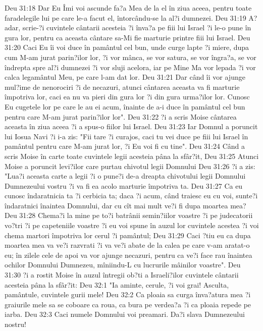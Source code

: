 Deu 31:18  Dar Eu Îmi voi ascunde fa?a Mea de la el în ziua aceea, pentru toate faradelegile lui pe care le-a facut el, întorcându-se la al?i dumnezei.
Deu 31:19  A?adar, scrie-?i cuvintele cântarii acesteia ?i înva?a pe fiii lui Israel ?i le-o pune în gura lor, pentru ca aceasta cântare sa-Mi fie marturie printre fiii lui Israel.
Deu 31:20  Caci Eu îi voi duce în pamântul cel bun, unde curge lapte ?i miere, dupa cum M-am jurat parin?ilor lor, ?i vor mânca, se vor satura, se vor îngra?a, se vor îndrepta spre al?i dumnezei ?i vor sluji acelora, iar pe Mine Ma vor lepada ?i vor calca legamântul Meu, pe care l-am dat lor.
Deu 31:21  Dar când îi vor ajunge mul?ime de nenorociri ?i de necazuri, atunci cântarea aceasta va fi marturie împotriva lor, caci ea nu va pieri din gura lor ?i din gura urma?ilor lor. Cunosc Eu cugetele lor pe care le au ei acum, înainte de a-i duce în pamântul cel bun pentru care M-am jurat parin?ilor lor".
Deu 31:22  ?i a scris Moise cântarea aceasta în ziua aceea ?i a spus-o fiilor lui Israel.
Deu 31:23  Iar Domnul a poruncit lui Iosua Navi ?i i-a zis: "Fii tare ?i curajos, caci tu vei duce pe fiii lui Israel în pamântul pentru care M-am jurat lor, ?i Eu voi fi cu tine".
Deu 31:24  Când a scris Moise în carte toate cuvintele legii acesteia pâna la sfâr?it,
Deu 31:25  Atunci Moise a poruncit levi?ilor care purtau chivotul legii Domnului
Deu 31:26  ?i a zis: "Lua?i aceasta carte a legii ?i o pune?i de-a dreapta chivotului legii Domnului Dumnezeului vostru ?i va fi ea acolo marturie împotriva ta.
Deu 31:27  Ca eu cunosc îndaratnicia ta ?i cerbicia ta; daca ?i acum, când traiesc eu cu voi, sunte?i îndaratnici înaintea Domnului, dar cu cît mai mult ve?i fi dupa moartea mea?
Deu 31:28  Chema?i la mine pe to?i batrânii semin?iilor voastre ?i pe judecatorii vo?tri ?i pe capeteniile voastre ?i eu voi spune în auzul lor cuvintele acestea ?i voi chema martori împotriva lor cerul ?i pamântul;
Deu 31:29  Caci ?tiu eu ca dupa moartea mea va ve?i razvrati ?i va ve?i abate de la calea pe care v-am aratat-o eu; în zilele cele de apoi va vor ajunge necazuri, pentru ca ve?i face rau înaintea ochilor Domnului Dumnezeu, mîniindu-L cu lucrurile mâinilor voastre".
Deu 31:30  ?i a rostit Moise în auzul întregii ob?ti a Israeli?ilor cuvintele cântarii acesteia pâna la sfâr?it:
Deu 32:1  "Ia aminte, cerule, ?i voi grai! Asculta, pamântule, cuvintele gurii mele!
Deu 32:2  Ca ploaia sa curga înva?atura mea ?i graiurile mele sa se coboare ca roua, ca bura pe verdea?a ?i ca ploaia repede pe iarba.
Deu 32:3  Caci numele Domnului voi preamari. Da?i slava Dumnezeului nostru!
